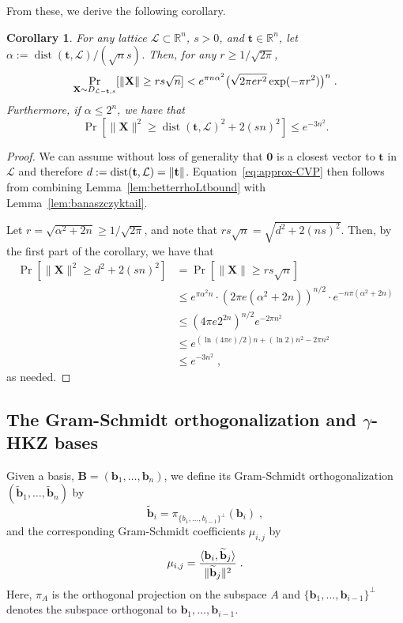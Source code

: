 \documentclass[11pt]{article}
\newtheorem{corollary}[theorem]{Corollary}
\newcommand{\R}{\ensuremath{\mathbb{R}}}
\renewcommand{\vec}[1]{\ensuremath{\mathbf{#1}}}
\newcommand{\basis}{\ensuremath{\mathbf{B}}}
\newcommand{\lat}{\mathcal{L}}
\newcommand{\gs}[1]{\ensuremath{\widetilde{#1}}}
\DeclareMathOperator{\dist}{dist}
\DeclarePairedDelimiter\inner{\langle}{\rangle}
\DeclarePairedDelimiter\length{\lVert}{\rVert}
\begin{document}
From these, we derive the following corollary.

\begin{corollary}
\label{cor:banaszczykcor}
For any lattice $\lat \subset \R^n$, $s > 0$, and $\vec{t} \in \R^n$, let $\alpha := \dist(\vec{t}, \lat)/(\sqrt{n}s)$. Then, for any $r \geq 1/\sqrt{2\pi}$,
\begin{equation}
\label{eq:approx-CVP}
\Pr_{\vec{X} \sim D_{\lat - \vec{t}, s}}[\length{\vec{X}} \geq r s\sqrt{n} ] <
e^{\pi n \alpha^2}\big( \sqrt{2 \pi e r^2} \exp(-\pi r^2) \big)^n
\; .
\end{equation}
Furthermore, if $\alpha \leq 2^n$, we have that 
\[
\Pr[\|\vec{X}\|^2 \geq \dist(\vec{t}, \lat)^2 + 2(sn)^2] \leq e^{-3n^2} \text{.}
\]
\end{corollary}
\begin{proof}
We can assume without loss of generality that $\vec{0}$ is a closest vector to
$\vec{t}$ in $\lat$ and therefore $d := \dist(\vec{t}, \lat) = \length{\vec{t}}$.
Equation~\ref{eq:approx-CVP} then follows from combining
Lemma~\ref{lem:betterrhoLtbound} with Lemma~\ref{lem:banaszczyktail}. 

Let $r = \sqrt{\alpha^2 + 2n} \geq 1/\sqrt{2\pi}$, and note that $r s\sqrt{n} =
\sqrt{d^2 + 2(ns)^2}$. Then, by the first part of the corollary, we have that 
\begin{align*}
\Pr[\|\vec{X}\|^2 \geq d^2 + 2(sn)^2] &= \Pr[\|\vec{X}\| \geq rs\sqrt{n}] \\
&\leq e^{\pi \alpha^2 n} \cdot \left(2 \pi e(\alpha^2+2n) \right)^{n/2} \cdot
e^{-n\pi (\alpha^2+2n)} \\
&\leq \left(4 \pi e 2^{2n}\right)^{n/2} e^{-2\pi n^2}  \\
&\leq e^{(\ln(4 \pi e)/2) n + (\ln 2) n^2 - 2\pi n^2} \\
&\leq e^{-3n^2} \; ,
\end{align*}
as needed.
\end{proof}



\subsection{The Gram-Schmidt orthogonalization and \texorpdfstring{$\gamma$}{gamma}-HKZ bases}

Given a basis, $\basis = (\vec{b}_1,\ldots, \vec{b}_n)$, we define its Gram-Schmidt orthogonalization $(\gs{\vec{b}}_1,\ldots, \gs{\vec{b}}_n)$ by
\[  \gs{\vec{b}}_i = \pi_{\{b_1, \ldots, b_{i-1} \}^\perp}(\vec{b}_i) \; , \]
and the corresponding Gram-Schmidt coefficients $\mu_{i,j}$ by
\[ \mu_{i,j}= \frac{\inner{\vec{b}_i, \gs{\vec{b}}_j}}{\length{\gs{\vec{b}}_j}^2}\; . \]
Here, $\pi_A$ is the orthogonal projection on the subspace $A$ and $\{\vec{b}_1,
\ldots, \vec{b}_{i-1} \}^\perp$ denotes the subspace orthogonal to $\vec{b}_1,
\ldots, \vec{b}_{i-1}$.
\end{document}
